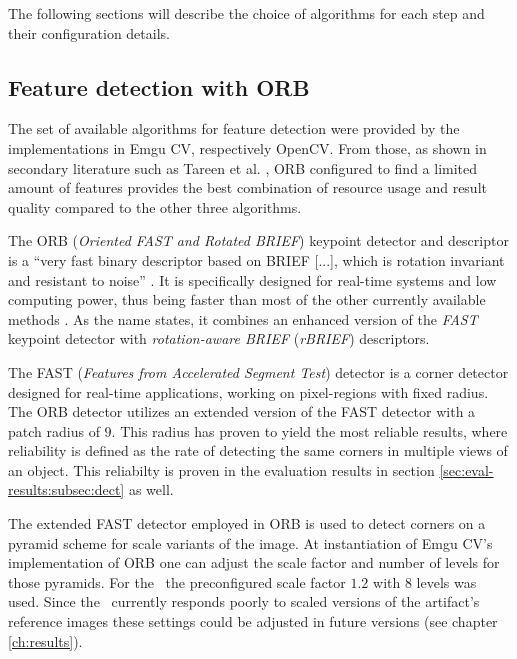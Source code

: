The following sections will describe the choice of algorithms for each step and their configuration details.

\subsection{Feature detection with ORB}\label{sec:tech-bg:subsec:feature-detection}

The set of available algorithms for feature detection were provided by the implementations in Emgu CV, respectively OpenCV. From those, as shown in secondary literature such as Tareen et al. \cite{orb_comparison}, ORB configured to find a limited amount of features provides the best combination of resource usage and result quality compared to the other three algorithms.

The ORB (\emph{Oriented FAST and Rotated BRIEF}) keypoint detector and descriptor is a ``very fast binary descriptor based on BRIEF [...], which is rotation invariant and resistant to noise'' \cite[p.~1]{orb}. It is specifically designed for real-time systems and low computing power, thus being faster than most of the other currently available methods \cite{orb, orb_comparison}. As the name states, it combines an enhanced version of the \emph{FAST} \cite{fast} keypoint detector with \emph{rotation-aware BRIEF} (\emph{rBRIEF}) \cite{brief} descriptors. \cite{orb, fast, brief}

The FAST (\emph{Features from Accelerated Segment Test}) detector \cite{fast} is a corner detector designed for real-time applications, working on pixel-regions with fixed radius. The ORB detector utilizes an extended version of the FAST detector with a patch radius of $9$. This radius has proven to yield the most reliable results, where reliability is defined as the rate of detecting the same corners in multiple views of an object. This reliabilty is proven in the evaluation results in section \ref{sec:eval-results:subsec:dect} as well. \cite{fast, orb}

The extended FAST detector employed in ORB is used to detect corners on a pyramid scheme for scale variants \cite{scale_pyramids} of the image. At instantiation of Emgu CV's implementation of ORB one can adjust the scale factor and number of levels for those pyramids. For the \vd~the preconfigured scale factor $1.2$ with $8$ levels was used. Since the \vd~currently responds poorly to scaled versions of the artifact's reference images these settings could be adjusted in future versions (see chapter \ref{ch:results}).

